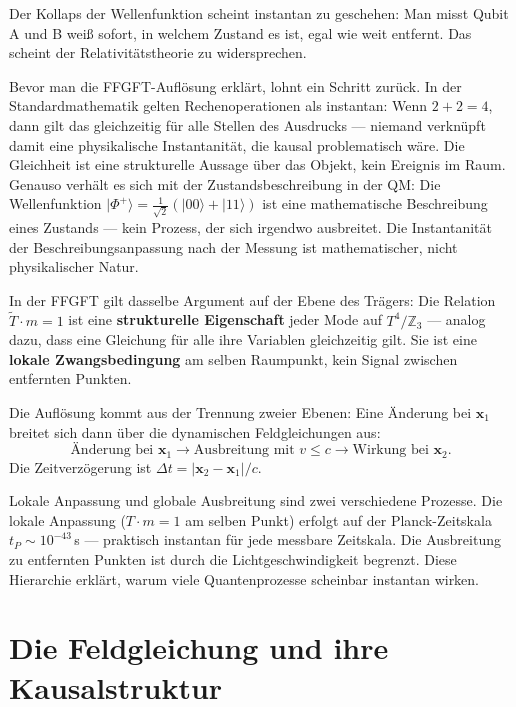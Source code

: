 Der Kollaps der Wellenfunktion scheint instantan zu geschehen: Man misst
Qubit A und B weiß sofort, in welchem Zustand es ist, egal wie weit
entfernt. Das scheint der Relativitätstheorie zu widersprechen.

Bevor man die FFGFT-Auflösung erklärt, lohnt ein Schritt zurück. In
der Standardmathematik gelten Rechenoperationen als instantan: Wenn
$2 + 2 = 4$, dann gilt das gleichzeitig für alle Stellen des Ausdrucks
--- niemand verknüpft damit eine physikalische Instantanität, die
kausal problematisch wäre. Die Gleichheit ist eine strukturelle
Aussage über das Objekt, kein Ereignis im Raum. Genauso verhält es
sich mit der Zustandsbeschreibung in der QM: Die Wellenfunktion
$|\Phi^+\rangle = \frac{1}{\sqrt2}(|00\rangle+|11\rangle)$ ist eine
mathematische Beschreibung eines Zustands --- kein Prozess, der sich
irgendwo ausbreitet. Die Instantanität der Beschreibungsanpassung nach
der Messung ist mathematischer, nicht physikalischer Natur.

In der FFGFT gilt dasselbe Argument auf der Ebene des Trägers: Die
Relation $\tilde T\cdot m = 1$ ist eine \textbf{strukturelle
Eigenschaft} jeder Mode auf $T^4/\mathbb{Z}_3$ --- analog dazu, dass
eine Gleichung für alle ihre Variablen gleichzeitig gilt. Sie ist eine
\textbf{lokale Zwangsbedingung} am selben Raumpunkt, kein
Signal zwischen entfernten Punkten.

Die Auflösung kommt aus der Trennung zweier Ebenen: Eine Änderung bei $\mathbf{x}_1$ breitet sich dann über
die dynamischen Feldgleichungen aus:
\begin{equation}
  \text{Änderung bei }\mathbf{x}_1
  \to \text{Ausbreitung mit }v\le c
  \to \text{Wirkung bei }\mathbf{x}_2.
\end{equation}
Die Zeitverzögerung ist $\Delta t = |\mathbf{x}_2-\mathbf{x}_1|/c$.

Lokale Anpassung und globale Ausbreitung sind zwei verschiedene Prozesse.
Die lokale Anpassung ($T\cdot m = 1$ am selben Punkt) erfolgt auf der
Planck-Zeitskala $t_P\sim10^{-43}$\,s --- praktisch instantan für jede
messbare Zeitskala. Die Ausbreitung zu entfernten Punkten ist durch die
Lichtgeschwindigkeit begrenzt. Diese Hierarchie erklärt, warum viele
Quantenprozesse scheinbar instantan wirken.

\section{Die Feldgleichung und ihre Kausalstruktur}

